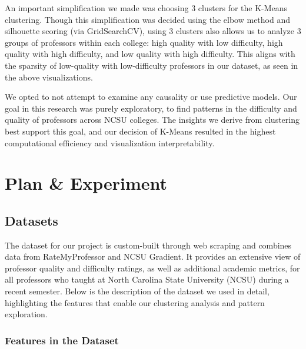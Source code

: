 \documentclass[sigconf,nonacm]{acmart}
\begin{document}
An important simplification we made was choosing 3 clusters for the K-Means clustering. Though this simplification was decided using the elbow method and silhouette scoring (via GridSearchCV), using 3 clusters also allows us to analyze 3 groups of professors within each college: high quality with low difficulty, high quality with high difficulty, and low quality with high difficulty. This aligns with the sparsity of low-quality with low-difficulty professors in our dataset, as seen in the above visualizations.

We opted to not attempt to examine any causality or use predictive models. Our goal in this research was purely exploratory, to find patterns in the difficulty and quality of professors across NCSU colleges. The insights we derive from clustering best support this goal, and our decision of K-Means resulted in the highest computational efficiency and visualization interpretability.

\section{Plan \& Experiment}
\subsection{Datasets}
The dataset for our project is custom-built through web scraping and combines data from RateMyProfessor and NCSU Gradient. It provides an extensive view of professor quality and difficulty ratings, as well as additional academic metrics, for all professors who taught at North Carolina State University (NCSU) during a recent semester. Below is the description of the dataset we used in detail, highlighting the features that enable our clustering analysis and pattern exploration.

\subsubsection{Features in the Dataset}
\end{document}

